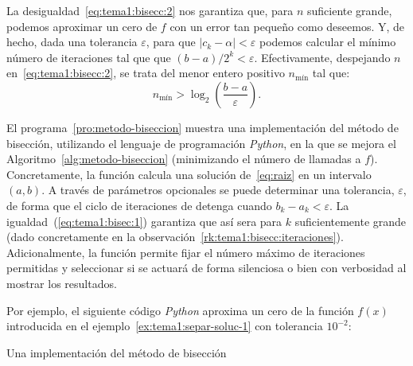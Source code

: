 \begin{remark}
  \label{rk:tema1:bisecc:iteraciones}
  La desigualdad~\eqref{eq:tema1:bisecc:2} nos garantiza que, para $n$
  suficiente grande, podemos aproximar un cero de $f$ con un error tan
  pequeño como deseemos. Y, de hecho, dada una tolerancia $\varepsilon$,
  para que $|c_k-\alpha|<\varepsilon$ podemos calcular el mínimo número
  de iteraciones tal que que $(b-a)/2^k < \varepsilon$. Efectivamente,
  despejando $n$ en~\eqref{eq:tema1:bisecc:2}, se trata del menor
  entero positivo $n_{\text{mín}}$ tal que:
  \begin{equation*}
    n_{\text{mín}}>\log_2\left(\frac{b-a}{\varepsilon}\right).
  \end{equation*}
\end{remark}


\begin{test}
  El programa~\ref{pro:metodo-biseccion} muestra una implementación
  del método de bisección, utilizando el lenguaje de programación
  \textit{Python}, en la que se mejora el
  Algoritmo~\ref{alg:metodo-biseccion} (minimizando el número de
  llamadas a $f$). Concretamente, la función
   calcula una solución
  de~\eqref{eq:raiz} en un intervalo $(a,b)$. A través de parámetros
  opcionales se puede determinar una tolerancia, $\varepsilon$, de
  forma que el ciclo de iteraciones de detenga cuando
  $b_k-a_k<\varepsilon$. La igualdad~(\ref{eq:tema1:bisec:1})
  garantiza que así sera para $k$ suficientemente grande (dado
  concretamente en la
  observación~\ref{rk:tema1:bisecc:iteraciones}). Adicionalmente, la
  función permite fijar el número máximo de iteraciones permitidas y
  seleccionar si se actuará de forma silenciosa o bien con
  verbosidad al mostrar los resultados.

  Por ejemplo, el siguiente código \textit{Python} aproxima un cero de
  la función $f(x)$ introducida en el
  ejemplo~\ref{ex:tema1:separ-soluc-1} 
  con tolerancia $10^{-2}$:
  \begin{pythonoutput}
  \end{pythonoutput}
\end{test}


\begin{program}
  \label{pro:metodo-biseccion}
  \caption{Una implementación del método de bisección}
\end{program}


